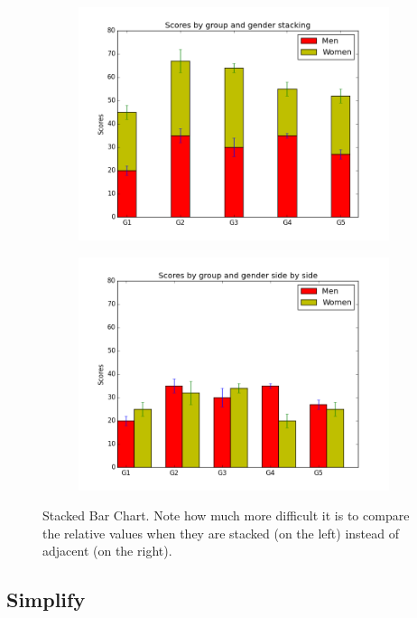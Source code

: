 \begin{figure}
\centering
\begin{subfigure}{.45\textwidth}
\centering
\includegraphics[width=\textwidth]{stackedbar.png}
\end{subfigure}
\begin{subfigure}{.45\textwidth}
\centering
\includegraphics[width=\textwidth]{unstackedbar.png}
\end{subfigure}
\caption{Stacked Bar Chart. Note how much more difficult it is to compare the relative values when they are stacked (on the left) instead of adjacent (on the right).}
\label{fig:stacked}
\end{figure}

\subsection*{Simplify}

